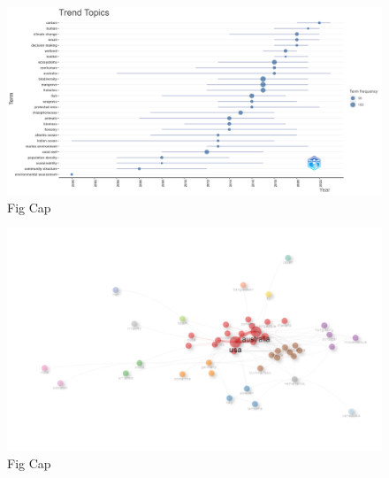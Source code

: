 \documentclass[
  12pt,
]{article}
\begin{document}
\begin{figure}
\includegraphics[width=1\linewidth]{TrendTopics} \caption{Fig Cap \label{TrendTopics}}\label{fig:TrendTopics}
\end{figure}



\begin{figure}
\includegraphics[width=1\linewidth]{CountryCollaborationNetwork} \caption{Fig Cap \label{CountryCollaborationNetwork}}\label{fig:CountryCollaborationNetwork}
\end{figure}
\end{document}

